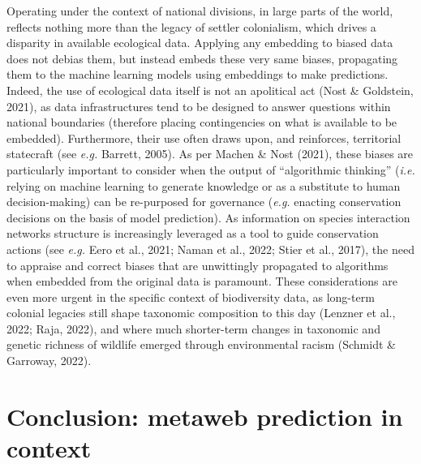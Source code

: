 \documentclass[10pt,oneside]{article}
\begin{document}
Operating under the context of national divisions, in large parts of the
world, reflects nothing more than the legacy of settler colonialism,
which drives a disparity in available ecological data. Applying any
embedding to biased data does not debias them, but instead embeds these
very same biases, propagating them to the machine learning models using
embeddings to make predictions. Indeed, the use of ecological data
itself is not an apolitical act (Nost \& Goldstein, 2021), as data
infrastructures tend to be designed to answer questions within national
boundaries (therefore placing contingencies on what is available to be
embedded). Furthermore, their use often draws upon, and reinforces,
territorial statecraft (see \emph{e.g.} Barrett, 2005). As per Machen \&
Nost (2021), these biases are particularly important to consider when
the output of ``algorithmic thinking'' (\emph{i.e.} relying on machine
learning to generate knowledge or as a substitute to human
decision-making) can be re-purposed for governance (\emph{e.g.} enacting
conservation decisions on the basis of model prediction). As information
on species interaction networks structure is increasingly leveraged as a
tool to guide conservation actions (see \emph{e.g.} Eero et al., 2021;
Naman et al., 2022; Stier et al., 2017), the need to appraise and
correct biases that are unwittingly propagated to algorithms when
embedded from the original data is paramount. These considerations are
even more urgent in the specific context of biodiversity data, as
long-term colonial legacies still shape taxonomic composition to this
day (Lenzner et al., 2022; Raja, 2022), and where much shorter-term
changes in taxonomic and genetic richness of wildlife emerged through
environmental racism (Schmidt \& Garroway, 2022).

\hypertarget{conclusion-metaweb-prediction-in-context}{%
\section{Conclusion: metaweb prediction in
context}\label{conclusion-metaweb-prediction-in-context}}
\end{document}
